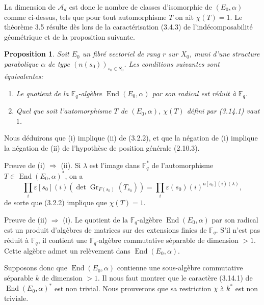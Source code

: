 \documentclass[11pt,a4paper]{article}
\theoremstyle{plain}
\newtheorem{proposition}[theorem]{Proposition}
\theoremstyle{definition}
\DeclareMathOperator{\End}{End}
\DeclareMathOperator{\Gri}{Gr}
\newcommand{\F}{\mathbb{F}}
\begin{document}
La dimension de $\mathcal{A}_d$ est donc le nombre de classes d'isomorphie de $(E_0, \alpha)$ comme ci-dessus, tels que pour tout automorphisme $T$ on ait $\chi(T) = 1$. Le th\'eor\`eme 3.5 r\'esulte d\`es lors de la caract\'erisation (3.4.3) de l'ind\'ecomposabilit\'e g\'eom\'etrique et de la proposition suivante.

\begin{proposition}
Soit $E_0$ un fibr\'e vectoriel de rang $r$ sur $X_0$, muni d'une structure parabolique $\alpha$ de type $(n(s_0))_{s_0 \in S_0}$. Les conditions suivantes sont \'equivalentes:
\begin{enumerate}[label=(\roman*)]
\item Le quotient de la $\F_q$-alg\`ebre $\End(E_0, \alpha)$ par son radical est r\'eduit \`a $\F_q$.
\item Quel que soit l'automorphisme $T$ de $(E_0, \alpha)$, $\chi(T)$ d\'efini par (3.14.1) vaut $1$.
\end{enumerate}
\end{proposition}

Nous d\'eduirons que (i) implique (ii) de (3.2.2), et que la n\'egation de (i) implique la n\'egation de (ii) de l'hypoth\`ese de position g\'en\'erale (2.10.3).

Preuve de (i) $\Rightarrow$ (ii). Si $\lambda$ est l'image dans $\F_q^*$ de l'automorphisme $T \in \End(E_0, \alpha)^*$, on a
\[
\prod_i \varepsilon[s_0](i)(\det \Gri_{F(s_0)}(T_{s_0})) = \prod_i \varepsilon(s_0)(i)^{n[s_0](i)(\lambda)},
\]
de sorte que (3.2.2) implique que $\chi(T) = 1$.

Preuve de (ii) $\Rightarrow$ (i). Le quotient de la $\F_q$-alg\`ebre $\End(E_0, \alpha)$ par son radical est un produit d'alg\`ebres de matrices sur des extensions finies de $\F_q$. S'il n'est pas r\'eduit \`a $\F_q$, il contient une $\F_q$-alg\`ebre commutative s\'eparable de dimension $> 1$. Cette alg\`ebre admet un rel\`evement dans $\End(E_0, \alpha)$.

Supposons donc que $\End(E_0, \alpha)$ contienne une sous-alg\`ebre commutative s\'eparable $k$ de dimension $> 1$. Il nous faut montrer que le caract\`ere (3.14.1) de $\End(E_0, \alpha)^*$ est non trivial. Nous prouverons que sa restriction $\chi$ \`a $k^*$ est non triviale.
\end{document}
